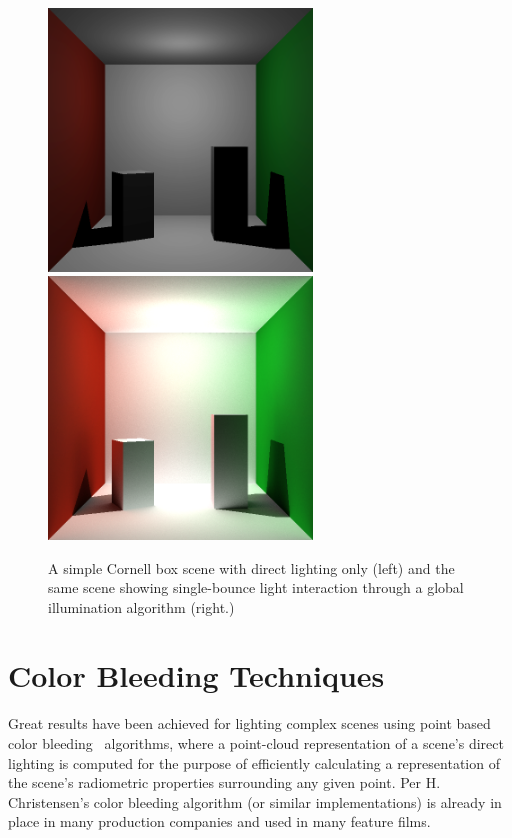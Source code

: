 \begin{figure}[h!]
    \centering
    \includegraphics[width=70mm]{../img/boxes_noindirect.png}
    \includegraphics[width=70mm]{../img/indirect_box_high.png}
    \captionfonts
    \caption{A simple Cornell box scene with direct lighting only (left) and the same scene showing single-bounce light interaction through a global illumination algorithm (right.)}
    \label{fig:cornell}
\end{figure}

\section{Color Bleeding Techniques}

Great results have been achieved for lighting complex scenes using point based color bleeding~\cite{christensen:2008} algorithms, where a point-cloud representation of a scene's direct lighting is computed for the purpose of efficiently calculating a representation of the scene's radiometric properties surrounding any given point.  Per H. Christensen's color bleeding algorithm (or similar implementations) is already in place in many production companies and used in many feature films.

